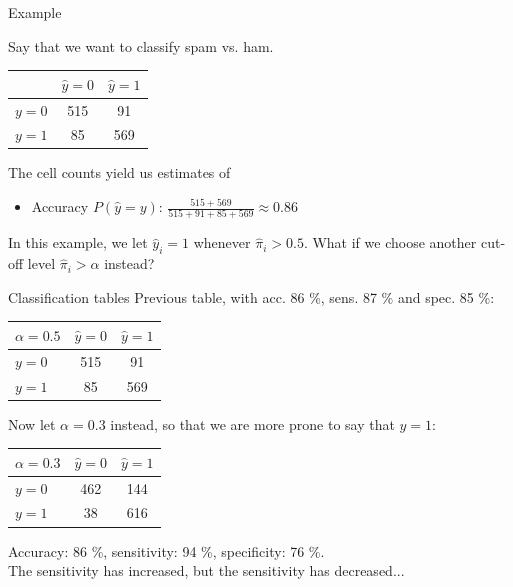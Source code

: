 \documentclass[10pt,handout]{beamer}
\begin{document}
\begin{frame}{Example}

Say that we want to classify spam vs. ham. \\[3mm]\pause

\begin{center}
\begin{tabular}{ l | c | c }
  & $\hat{y}=0$ & $\hat{y}=1$\\
  \hline
  $y=0$ & 515 & 91 \\
  $y=1$ & 85 & 569 \\
  \hline
\end{tabular}
\end{center}
The cell counts yield us estimates of
\begin{itemize}
\item Accuracy $P(\hat{y}=y)$: $\frac{515+569}{515+91+85+569}\approx 0.86$\\[3mm]\pause
\end{itemize}

In this example, we let $\hat{y}_i=1$ whenever $\hat{\pi}_i>0.5$. What if we choose another cut-off level $\hat{\pi}_i>\alpha$ instead?

\end{frame}


\begin{frame}{Classification tables}
Previous table, with acc. 86 \%, sens. 87 \% and spec. 85 \%:
\begin{center}
\begin{tabular}{ l | c | c }
 {\color{uured}$\alpha=0.5$} & $\hat{y}=0$ & $\hat{y}=1$\\
  \hline
  $y=0$ & 515 & 91 \\
  $y=1$ & 85 & 569 \\
  \hline
\end{tabular}
\end{center}
\pause
Now let $\alpha=0.3$ instead, so that we are more prone to say that $\hat{y}=1$:
\begin{center}
\begin{tabular}{ l | c | c }
  {\color{uured}$\alpha=0.3$} & $\hat{y}=0$ & $\hat{y}=1$\\
  \hline
  $y=0$ & 462 & 144 \\
  $y=1$ & 38 & 616 \\
  \hline
\end{tabular}
\end{center}
Accuracy: 86 \%, sensitivity: 94 \%, specificity: 76 \%.\\[3mm]
The sensitivity has increased, but the sensitivity has decreased...

\end{frame}
\end{document}
